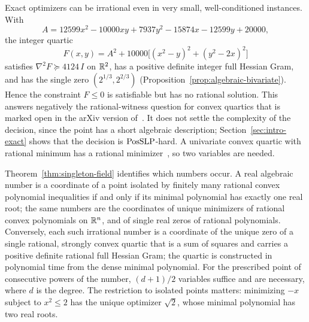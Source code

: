 Exact optimizers can be irrational even in very small, well-conditioned
instances. With
\[
A=12599x^2-10000xy+7937y^2-15874x-12599y+20000,
\]
the integer quartic
\[
F(x,y)=A^2+10000\bigl[(x^2-y)^2+(y^2-2x)^2\bigr]
\]
satisfies $\nabla^2F\succeq4124\,I$ on $\mathbb R^2$, has a positive definite
integer full Hessian Gram, and has the single zero $(2^{1/3},2^{2/3})$
(Proposition~\ref{prop:algebraic-bivariate}). Hence the constraint $F\le0$ is
satisfiable but has no rational solution. This answers negatively the
rational-witness question for convex quartics that is marked open in the
arXiv version of~\cite{SlotSteurerWiedmer2025}. It does not settle the
complexity of the decision, since the point has a short algebraic
description; Section~\ref{sec:intro-exact} shows that the decision is
$\mathrm{PosSLP}$-hard. A univariate convex quartic with rational minimum has a
rational minimizer~\cite[Lemma~C.3]{SlotSteurerWiedmer2025}, so two
variables are needed.

Theorem~\ref{thm:singleton-field} identifies which numbers occur. A real
algebraic number is a coordinate of a point isolated by finitely many
rational convex polynomial inequalities if and only if its minimal polynomial
has exactly one real root; the same numbers are the coordinates of unique
minimizers of rational convex polynomials on $\mathbb R^n$, and of single real zeros
of rational polynomials. Conversely, each such irrational number is a
coordinate of the unique zero of a single rational, strongly convex quartic
that is a sum of squares and carries a positive definite rational full
Hessian Gram; the quartic is constructed in polynomial time from the dense
minimal polynomial. For the prescribed point of consecutive powers of the
number, $(d+1)/2$ variables suffice and are necessary, where $d$ is the
degree. The restriction to isolated points matters: minimizing $-x$ subject
to $x^2\le2$ has the unique optimizer $\sqrt2$, whose minimal polynomial has
two real roots.


